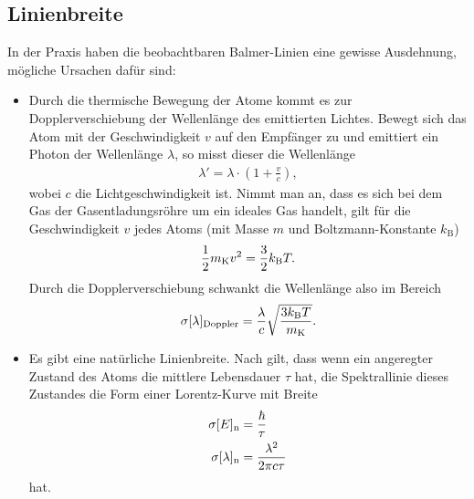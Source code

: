 \subsection{Linienbreite}
In der Praxis haben die beobachtbaren Balmer-Linien eine gewisse Ausdehnung, mögliche Ursachen dafür sind:
\begin{itemize}
\item    
Durch die thermische Bewegung der Atome kommt es zur Dopplerverschiebung der Wellenlänge des emittierten Lichtes. Bewegt sich das Atom mit der Geschwindigkeit $v$ auf den Empfänger zu und emittiert ein Photon der Wellenlänge $\lambda$, so misst dieser die Wellenlänge 
\begin{align*}
  \lambda'=\lambda \cdot \left(  1+ \frac{v}{c} \right),
\end{align*} 
wobei $c$ die Lichtgeschwindigkeit ist. Nimmt man an, dass es sich bei dem Gas der Gasentladungsröhre um ein ideales Gas handelt, gilt für die Geschwindigkeit $v$ jedes Atoms (mit Masse $m$ und Boltzmann-Konstante $k_\mathrm{B}$)
\begin{align*}
  \frac{1}{2} m_\mathrm{K} v^2=\frac{3}{2} k_\mathrm{B} T.
\end{align*}
Durch die Dopplerverschiebung schwankt die Wellenlänge also im Bereich
\begin{align}
  \sigma[\lambda]_\mathrm{Doppler}=\frac{\lambda}{c}\sqrt{\frac{3k_\mathrm{B}T}{m_\mathrm{K}}}.
  \label{equ:doppler}
\end{align}
\item Es gibt eine natürliche Linienbreite. Nach \cite{unschaerfe} gilt, dass wenn ein angeregter Zustand des Atoms die mittlere Lebensdauer $\tau$ hat, die Spektrallinie dieses Zustandes die Form einer Lorentz-Kurve mit Breite 
\begin{align}
  \sigma[E]_\mathrm{n}&=\frac{\hbar}{\tau}\nonumber\\
  \sigma[\lambda]_\mathrm{n} &= \frac{\lambda^2}{2\pi c \tau}
  \label{equ:natbreite}
\end{align}
hat.
\end{itemize}